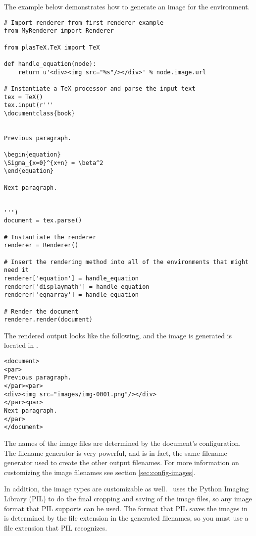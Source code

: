 The example below demonstrates how to generate an image for the
 environment.
\begin{verbatim}
# Import renderer from first renderer example
from MyRenderer import Renderer

from plasTeX.TeX import TeX

def handle_equation(node):
    return u'<div><img src="%s"/></div>' % node.image.url

# Instantiate a TeX processor and parse the input text
tex = TeX()
tex.input(r'''
\documentclass{book}


Previous paragraph.

\begin{equation}
\Sigma_{x=0}^{x+n} = \beta^2
\end{equation}

Next paragraph.


''')
document = tex.parse()

# Instantiate the renderer
renderer = Renderer()

# Insert the rendering method into all of the environments that might need it
renderer['equation'] = handle_equation
renderer['displaymath'] = handle_equation
renderer['eqnarray'] = handle_equation

# Render the document
renderer.render(document)
\end{verbatim}

The rendered output looks like the following, and the image is generated
is located in .
\begin{verbatim}
<document>
<par>
Previous paragraph.
</par><par>
<div><img src="images/img-0001.png"/></div>
</par><par>
Next paragraph.
</par>
</document>
\end{verbatim}

The names of the image files are determined by the document's configuration.
The filename generator is very powerful, and is in fact, the same filename
generator used to create the other output filenames.  For more information
on customizing the image filenames see section \ref{sec:config-images}.

In addition, the image types are customizable as well.  \plasTeX\ uses
the Python Imaging Library (PIL) to do the final cropping and saving of the
image files, so any image format that PIL supports can be used.  The
format that PIL saves the images in is determined by the file extension
in the generated filenames, so you must use a file extension that
PIL recognizes.


